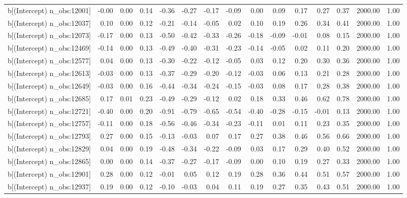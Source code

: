 \begin{table}[ht]
\begin{tabular}{rrrrrrrrrrrrrrr}
  b[(Intercept) n\_obs:12001] & -0.00 & 0.00 & 0.14 & -0.36 & -0.27 & -0.17 & -0.09 & 0.00 & 0.09 & 0.17 & 0.27 & 0.37 & 2000.00 & 1.00 \\ 
  b[(Intercept) n\_obs:12037] & 0.10 & 0.00 & 0.12 & -0.21 & -0.14 & -0.05 & 0.02 & 0.10 & 0.19 & 0.26 & 0.34 & 0.41 & 2000.00 & 1.00 \\ 
  b[(Intercept) n\_obs:12073] & -0.17 & 0.00 & 0.13 & -0.50 & -0.42 & -0.33 & -0.26 & -0.18 & -0.09 & -0.01 & 0.08 & 0.15 & 2000.00 & 1.00 \\ 
  b[(Intercept) n\_obs:12469] & -0.14 & 0.00 & 0.13 & -0.49 & -0.40 & -0.31 & -0.23 & -0.14 & -0.05 & 0.02 & 0.11 & 0.20 & 2000.00 & 1.00 \\ 
  b[(Intercept) n\_obs:12577] & 0.04 & 0.00 & 0.13 & -0.30 & -0.22 & -0.12 & -0.05 & 0.03 & 0.12 & 0.20 & 0.30 & 0.36 & 2000.00 & 1.00 \\ 
  b[(Intercept) n\_obs:12613] & -0.03 & 0.00 & 0.13 & -0.37 & -0.29 & -0.20 & -0.12 & -0.03 & 0.06 & 0.13 & 0.21 & 0.28 & 2000.00 & 1.00 \\ 
  b[(Intercept) n\_obs:12649] & -0.03 & 0.00 & 0.16 & -0.44 & -0.34 & -0.24 & -0.15 & -0.03 & 0.08 & 0.17 & 0.28 & 0.38 & 2000.00 & 1.00 \\ 
  b[(Intercept) n\_obs:12685] & 0.17 & 0.01 & 0.23 & -0.49 & -0.29 & -0.12 & 0.02 & 0.18 & 0.33 & 0.46 & 0.62 & 0.78 & 2000.00 & 1.00 \\ 
  b[(Intercept) n\_obs:12721] & -0.40 & 0.00 & 0.20 & -0.91 & -0.79 & -0.65 & -0.54 & -0.40 & -0.28 & -0.15 & -0.01 & 0.13 & 2000.00 & 1.00 \\ 
  b[(Intercept) n\_obs:12757] & -0.11 & 0.00 & 0.18 & -0.56 & -0.46 & -0.34 & -0.23 & -0.11 & 0.01 & 0.11 & 0.23 & 0.35 & 2000.00 & 1.00 \\ 
  b[(Intercept) n\_obs:12793] & 0.27 & 0.00 & 0.15 & -0.13 & -0.03 & 0.07 & 0.17 & 0.27 & 0.38 & 0.46 & 0.56 & 0.66 & 2000.00 & 1.00 \\ 
  b[(Intercept) n\_obs:12829] & 0.04 & 0.00 & 0.19 & -0.48 & -0.34 & -0.22 & -0.09 & 0.03 & 0.17 & 0.29 & 0.40 & 0.52 & 2000.00 & 1.00 \\ 
  b[(Intercept) n\_obs:12865] & 0.00 & 0.00 & 0.14 & -0.37 & -0.27 & -0.17 & -0.09 & 0.00 & 0.10 & 0.19 & 0.27 & 0.33 & 2000.00 & 1.00 \\ 
  b[(Intercept) n\_obs:12901] & 0.28 & 0.00 & 0.12 & -0.01 & 0.05 & 0.12 & 0.19 & 0.28 & 0.36 & 0.44 & 0.51 & 0.57 & 2000.00 & 1.00 \\ 
  b[(Intercept) n\_obs:12937] & 0.19 & 0.00 & 0.12 & -0.10 & -0.03 & 0.04 & 0.11 & 0.19 & 0.27 & 0.35 & 0.43 & 0.51 & 2000.00 & 1.00 \\ 

\end{tabular}
\end{table}

